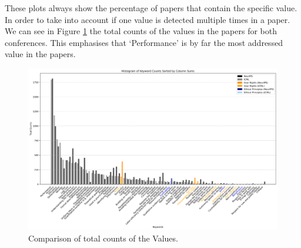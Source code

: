 \documentclass{article}
\begin{document}
These plots always show the percentage of papers that contain the specific value. In order to take into account if one value is detected multiple times in a paper. We can see in Figure \ref{fig:total_counts} the total counts of the values in the papers
for both conferences. This emphasises that `Performance' is by far the most addressed value in the papers. 
\begin{figure}[H]
    \centering
    \includegraphics[width=\textwidth]{../plots/histogram_keyword_counts_total_number.png}
    \caption{Comparison of total counts of the Values.}
    \label{fig:total_counts}
\end{figure}
\end{document}
